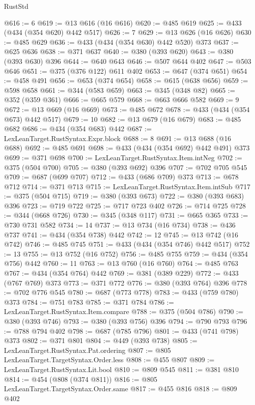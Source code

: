 \begin{lexlean}{RustStd}
\begin{coremodule}
@616 := 6
@619 := @13 @616 (@16 @616)
@620 := @485 @619
@625 := @433 (@434 (@354 @620) @442 @517)
@626 := 7
@629 := @13 @626 (@16 @626)
@630 := @485 @629
@636 := @433 (@434 (@354 @630) @442 @520) @373
@637 := @625 @636
@638 := @371 @637
@640 := @380 (@393 @620)
@643 := @380 (@393 @630) @396
@644 := @640 @643
@646 := @507 @644 @402
@647 := @503 @646
@651 := @375 (@376 @122) @611 @402
@653 := @647 (@374 @651)
@654 := @458 @491
@656 := @653 (@374 @654)
@658 := @615 (@638 @656)
@659 := @598 @658
@661 := @344 (@583 @659)
@663 := @345 (@348 @82)
@665 := @352 (@359 @361)
@666 := @665 @579
@668 := @663 @666 @582
@669 := 9
@672 := @13 @669 (@16 @669)
@673 := @485 @672
@678 := @433 (@434 (@354 @673) @442 @517)
@679 := 10
@682 := @13 @679 (@16 @679)
@683 := @485 @682
@686 := @434 (@354 @683) @442
@687 := LexLeanTarget.RustSyntax.Expr.block
@688 := 8
@691 := @13 @688 (@16 @688)
@692 := @485 @691
@698 := @433 (@434 (@354 @692) @442 @491) @373
@699 := @371 @698
@700 := LexLeanTarget.RustSyntax.Item.intNeg
@702 := @375 (@504 @700)
@705 := @380 (@393 @692) @396
@707 := @702 @705 @545
@709 := @687 (@699 @707)
@712 := @433 (@686 @709) @373
@713 := @678 @712
@714 := @371 @713
@715 := LexLeanTarget.RustSyntax.Item.intSub
@717 := @375 (@504 @715)
@719 := @380 (@393 @673)
@722 := @380 (@393 @683) @396
@723 := @719 @722
@725 := @717 @723 @402
@726 := @714 @725
@728 := @344 (@668 @726)
@730 := @345 (@348 @117)
@731 := @665 @365
@733 := @730 @731 @582
@734 := 14
@737 := @13 @734 (@16 @734)
@738 := @436 @737
@741 := @434 (@354 @738) @442
@742 := 12
@745 := @13 @742 (@16 @742)
@746 := @485 @745
@751 := @433 (@434 (@354 @746) @442 @517)
@752 := 13
@755 := @13 @752 (@16 @752)
@756 := @485 @755
@759 := @434 (@354 @756) @442
@760 := 11
@763 := @13 @760 (@16 @760)
@764 := @485 @763
@767 := @434 (@354 @764) @442
@769 := @381 (@389 @229)
@772 := @433 (@767 @769) @373
@773 := @371 @772
@776 := @380 (@393 @764) @396
@778 := @702 @776 @545
@780 := @687 (@773 @778)
@783 := @433 (@759 @780) @373
@784 := @751 @783
@785 := @371 @784
@786 := LexLeanTarget.RustSyntax.Item.compare
@788 := @375 (@504 @786)
@790 := @380 (@393 @746)
@793 := @380 (@393 @756) @396
@794 := @790 @793
@796 := @788 @794 @402
@798 := @687 (@785 @796)
@801 := @433 (@741 @798) @373
@802 := @371 @801
@804 := @449 (@393 @738)
@805 := LexLeanTarget.RustSyntax.Pat.ordering
@807 := @805 LexLeanTarget.TargetSyntax.Order.less
@808 := @455 @807
@809 := LexLeanTarget.RustSyntax.Lit.bool
@810 := @809 @545
@811 := @381 @810
@814 := @454 (@808 (@374 @811))
@816 := @805 LexLeanTarget.TargetSyntax.Order.same
@817 := @455 @816
@818 := @809 @402

\end{coremodule}
\end{lexlean}

